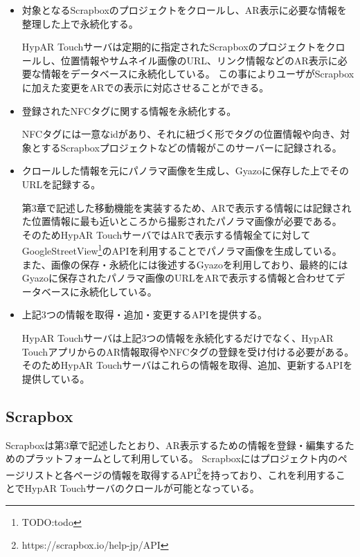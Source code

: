 \begin{itemize}
  \item 対象となるScrapboxのプロジェクトをクロールし、AR表示に必要な情報を整理した上で永続化する。
  
  HypAR Touchサーバは定期的に指定されたScrapboxのプロジェクトをクロールし、位置情報やサムネイル画像のURL、リンク情報などのAR表示に必要な情報をデータベースに永続化している。
  この事によりユーザがScrapboxに加えた変更をARでの表示に対応させることができる。
  \newline

  \item 登録されたNFCタグに関する情報を永続化する。
  
  NFCタグには一意なidがあり、それに紐づく形でタグの位置情報や向き、対象とするScrapboxプロジェクトなどの情報がこのサーバーに記録される。
  \newline

  \item クロールした情報を元にパノラマ画像を生成し、Gyazoに保存した上でそのURLを記録する。
  
  第3章で記述した移動機能を実装するため、ARで表示する情報には記録された位置情報に最も近いところから撮影されたパノラマ画像が必要である。
  そのためHypAR TouchサーバではARで表示する情報全てに対してGoogleStreetView\footnote{\textsf{TODO:todo}}のAPIを利用することでパノラマ画像を生成している。
  また、画像の保存・永続化には後述するGyazoを利用しており、最終的にはGyazoに保存されたパノラマ画像のURLをARで表示する情報と合わせてデータベースに永続化している。
  \newline

  \item 上記3つの情報を取得・追加・変更するAPIを提供する。
  
  HypAR Touchサーバは上記3つの情報を永続化するだけでなく、HypAR TouchアプリからのAR情報取得やNFCタグの登録を受け付ける必要がある。
  そのためHypAR Touchサーバはこれらの情報を取得、追加、更新するAPIを提供している。
  \newline

\end{itemize}

\subsection{Scrapbox}
Scrapboxは第3章で記述したとおり、AR表示するための情報を登録・編集するためのプラットフォームとして利用している。
Scrapboxにはプロジェクト内のページリストと各ページの情報を取得するAPI\footnote{\textsf{https://scrapbox.io/help-jp/API}}を持っており、これを利用することでHypAR Touchサーバのクロールが可能となっている。

